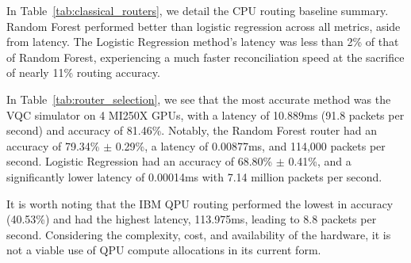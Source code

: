 \documentclass[journal]{IEEEtran}
\begin{document}
In Table~\ref{tab:classical_routers}, we detail the CPU routing baseline summary. Random Forest performed better than logistic regression across all metrics, aside from latency. The Logistic Regression method's latency was less than 2\% of that of Random Forest, experiencing a much faster reconciliation speed at the sacrifice of nearly 11\% routing accuracy. 

\vspace{1em}
\noindent
\begin{minipage}{\linewidth}
\centering
{}
\label{tab:classical_routers}
\end{minipage}
\vspace{1em}

In Table~\ref{tab:router_selection}, we see that the most accurate method was the VQC simulator on 4 MI250X GPUs, with a latency of 10.889ms (91.8 packets per second) and accuracy of 81.46\%. Notably, the Random Forest router had an accuracy of 79.34\% $\pm$ 0.29\%, a latency of 0.00877ms, and 114,000 packets per second. Logistic Regression had an accuracy of 68.80\% $\pm$ 0.41\%, and a significantly lower latency of 0.00014ms with 7.14 million packets per second. 

It is worth noting that the IBM QPU routing performed the lowest in accuracy (40.53\%) and had the highest latency, 113.975ms, leading to 8.8 packets per second. Considering the complexity, cost, and availability of the hardware, it is not a viable use of QPU compute allocations in its current form.
\end{document}
